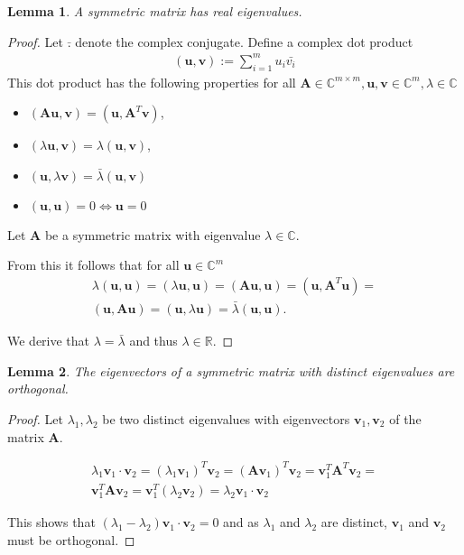 \documentclass[a4paper]{IEEEtran}
\newtheorem{lemma}{Lemma}
\begin{document}
\begin{lemma}
	A symmetric matrix has real eigenvalues.
\end{lemma}

\begin{proof}
	Let $\bar{.}$ denote the complex conjugate. Define a complex dot product
	\begin{align*}
		(\mathbf{u}, \mathbf{v}) := \sum_{i=1}^{m} u_i \bar{v_i}
	\end{align*}
	This dot product has the following properties for all $\mathbf{A} \in \mathbb{C}^{m\times m}, \mathbf{u}, \mathbf{v} \in \mathbb{C}^m, \lambda \in \mathbb{C}$
	\begin{itemize}
		\item $(\mathbf{Au}, \mathbf{v}) = (\mathbf{u}, \mathbf{A}^T\mathbf{v})$,
		\item $(\lambda \mathbf{u}, \mathbf{v}) = \lambda(\mathbf{u}, \mathbf{v})$,
		\item $(\mathbf{u}, \lambda \mathbf{v}) = \bar{\lambda} (\mathbf{u}, \mathbf{v})$
		\item $(\mathbf{u}, \mathbf{u}) = 0 \iff \mathbf{u} = 0$
	\end{itemize}
	
	Let $\mathbf{A}$ be a symmetric matrix with eigenvalue $\lambda \in \mathbb{C}$.
	
	From this it follows that for all $\mathbf{u} \in \mathbb{C}^m$
	\begin{align*}
		\lambda (\mathbf{u}, \mathbf{u}) = (\lambda \mathbf{u}, \mathbf{u}) = (\mathbf{Au}, \mathbf{u}) = (\mathbf{u}, \mathbf{A}^T\mathbf{u}) =\\
		(\mathbf{u}, \mathbf{Au}) =	(\mathbf{u}, \lambda\mathbf{u}) = \bar{\lambda} (\mathbf{u}, \mathbf{u}).
	\end{align*}
	
	We derive that $\lambda = \bar{\lambda}$ and thus $\lambda \in \mathbb{R}$.
\end{proof}

\begin{lemma}
	\label{lem:symmetric_matrix_eigenvector_orthogonal}
	The eigenvectors of a symmetric matrix with distinct eigenvalues are orthogonal.
\end{lemma}

\begin{proof}
	Let $\lambda_1, \lambda_2$ be two distinct eigenvalues with eigenvectors $\mathbf{v}_1, \mathbf{v}_2$ of the matrix $\mathbf{A}$.
	
	\begin{align*}
		\lambda_1 \mathbf{v}_1 \cdot \mathbf{v}_2 = (\lambda_1\mathbf{v}_1)^T \mathbf{v}_2 = (\mathbf{Av}_1)^T \mathbf{v}_2 = \mathbf{v}_1^T \mathbf{A}^T \mathbf{v}_2 =\\
		\mathbf{v}_1^T \mathbf{A} \mathbf{v}_2 = \mathbf{v}_1^T (\lambda_2 \mathbf{v}_2) = \lambda_2 \mathbf{v}_1 \cdot \mathbf{v}_2
	\end{align*}
	
	This shows that $(\lambda_1 - \lambda_2) \mathbf{v}_1 \cdot \mathbf{v}_2 = 0$ and as $\lambda_1$ and $\lambda_2$ are distinct, $\mathbf{v}_1$ and $\mathbf{v}_2$ must be orthogonal.
\end{proof}
\end{document}
